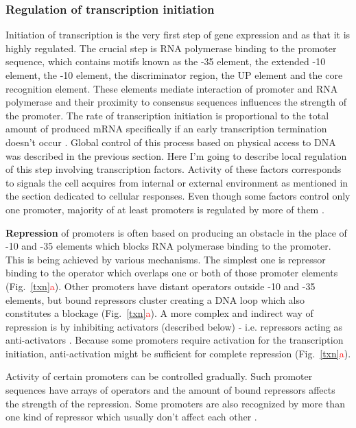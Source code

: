 \subsubsection{Regulation of transcription initiation}
Initiation of transcription is the very first step of gene expression and as that it is highly regulated.
The crucial step is RNA polymerase binding to the promoter sequence, which contains motifs known as the -35 element, the extended -10 element, the -10 element, the
discriminator region, the UP element and the core recognition element.
These elements mediate interaction of promoter and RNA polymerase and their proximity to consensus sequences influences the strength of the promoter.
The rate of transcription initiation is proportional to the total amount of produced mRNA specifically if an early transcription termination doesn't occur \cite{kennell1977transcription, iyer1996absolute}.
Global control of this process based on physical access to DNA was described in the previous section.
Here I'm going to describe local regulation of this step involving transcription factors.
Activity of these factors corresponds to signals the cell acquires from internal or external environment as mentioned in the section dedicated to cellular responses.
Even though some factors control only one promoter, majority of at least  promoters is regulated by more of them \cite{karp2014ecocyc}.

\textbf{Repression} of promoters is often based on producing an obstacle in the place of -10 and -35 elements which blocks RNA polymerase binding to the promoter.
This is being achieved by various mechanisms.
The simplest one is repressor binding to the operator which overlaps one or both of those promoter elements \cite{brent1981mechanism} (Fig.~\ref{txn}\textcolor{red}{a}).
Other promoters have distant operators outside -10 and -35 elements, but bound repressors cluster creating a DNA loop which also constitutes a blockage \cite{semsey2004dna} (Fig.~\ref{txn}\textcolor{red}{a}).
A more complex and indirect way of repression is by inhibiting activators (described below) - i.e. repressors acting as anti-activators \cite{sogaard1993protein}.
Because some promoters require activation for the transcription initiation, anti-activation might be sufficient for complete repression (Fig.~\ref{txn}\textcolor{red}{a}).

Activity of certain promoters can be controlled gradually.
Such promoter sequences have arrays of operators and the amount of bound repressors affects the strength of the repression.
Some promoters are also recognized by more than one kind of repressor which usually don't affect each other \cite{el2009repression}.

